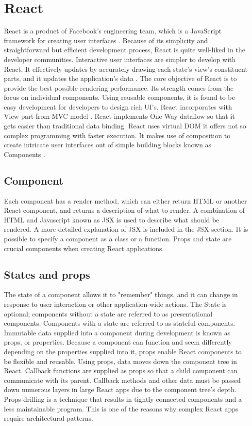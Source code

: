 \section{React}
React is a product of Facebook's engineering team, which is a JavaScript framework for creating user interfaces \autocite{gackenheimer2015introducing}. Because of its simplicity and straightforward but efficient development process, React is quite well-liked in the developer communities. Interactive user interfaces are simpler to develop with React. It effectively updates by accurately drawing each state's view's constituent parts, and it updates the application's data \autocite{islam2017reactjs}. The core objective of React is to provide the best possible rendering performance. Its strength comes from the focus on individual components. Using reusable components, it is found to be easy development for developers to design rich UI's. React incorporates with View part from MVC model \autocite{maratkar2021re}. React implements One Way dataflow so that it gets easier than traditional data binding. React uses virtual DOM it offers not so complex programming with faster execution. It makes use of composition to create intricate user interfaces out of simple building blocks known as Components \autocite{david2020building}.

\subsection{Component}
Each component has a render method, which can either return HTML or another React component, and returns a description of what to render. A combination of HTML and Javascript known as JSX is used to describe what should be rendered. A more detailed explanation of JSX is included in the JSX section. It is possible to specify a component as a class or a function. Props and state are crucial components when creating React applications.

\subsection{States and props}
The state of a component allows it to "remember" things, and it can change in response to user interaction or other application-wide actions. The State is optional; components without a state are referred to as presentational components. Components with a state are referred to as stateful components.
Immutable data supplied into a component during development is known as props, or properties. Because a component can function and seem differently depending on the properties supplied into it, props enable React components to be flexible and reusable.
Using props, data moves down the component tree in React. Callback functions are supplied as props so that a child component can communicate with its parent. Callback methods and other data must be passed down numerous layers in large React apps due to the component tree's depth. Props-drilling is a technique that results in tightly connected components and a less maintainable program. This is one of the reasons why complex React apps require architectural patterns.

